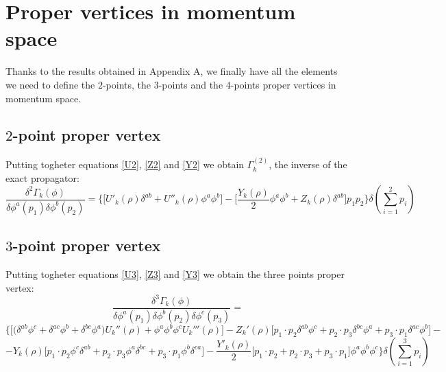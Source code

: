 \chapter{Proper vertices in momentum space}
Thanks to the results obtained in Appendix A, we finally have all the elements we need to define the $2$-points, the $3$-points and the $4$-points proper vertices in momentum space. 
\section{$2$-point proper vertex}
Putting togheter equations \eqref{U2}, \eqref{Z2} and \eqref{Y2} we obtain $\Gamma_k^{(2)}$, the inverse of the exact propagator:
\begin{equation}
 \frac{\delta^2 \Gamma_k(\phi)}{\delta\phi^a(p_1)\delta\phi^b(p_2)} = \Bigg\{\Big[U'_k(\rho)\delta^{ab} + U''_k(\rho){\phi}^a{\phi}^b\Big]- \Big[\frac{Y_k(\rho)}{2}\phi^a\phi^b + Z_k(\rho)\delta^{ab}\Big]p_1p_2\Bigg\}  \delta\left(\sum_{i=1}^2 p_i\right)
\end{equation}
\section{$3$-point proper vertex}
Putting togheter equations \eqref{U3}, \eqref{Z3} and \eqref{Y3}  we obtain the three points proper vertex:
\begin{equation}
 \frac{\delta^3 \Gamma_k(\phi)}{\delta \phi^a(p_1)\delta \phi^b(p_2)\delta \phi^c(p_3)} = 
\end{equation}
$$\Bigg\{\Big[\big(\delta^{ab}\phi^c + \delta^{ac}\phi^b + \delta^{bc}\phi^a\big)U_k''(\rho) + \phi^a\phi^b\phi^cU_k'''(\rho)\Big] - Z_k'(\rho)\Big[p_1\cdot p_2\delta^{ab}\phi^c + p_2\cdot p_3\delta^{bc}\phi^a + p_3\cdot p_1\delta^{ac}\phi^b\Big] -$$
$$ - Y_k(\rho)\Big[p_1\cdot p_2\phi^c\delta^{ab} + p_2\cdot  p_3 \phi^a \delta^{bc} + p_3\cdot p_1\phi^b\delta^{ca}\Big] - \frac{Y'_k(\rho)}{2}\Big[p_1\cdot p_2 + p_2\cdot p_3 + p_3\cdot p_1\Big]\phi^a\phi^b\phi^c\Bigg\}\delta\left(\sum_{i = 1}^3 p_i \right)$$

